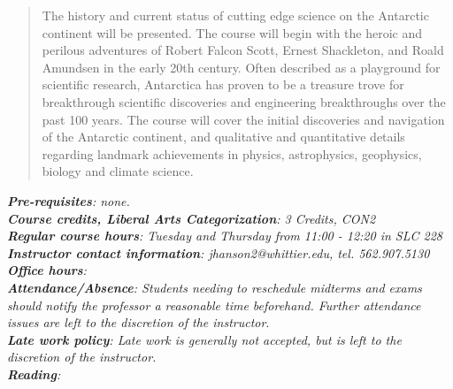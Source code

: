\documentclass[10pt]{article}
\begin{document}
\maketitle

\begin{abstract}
The history and current status of cutting edge science on the Antarctic continent will be presented. The course will begin with the heroic and perilous adventures of Robert Falcon Scott, Ernest Shackleton, and Roald Amundsen in the early 20th century. Often described as a playground for scientific research, Antarctica has proven to be a treasure trove for breakthrough scientific discoveries and engineering breakthroughs over the past 100 years. The course will cover the initial discoveries and navigation of the Antarctic continent, and qualitative and quantitative details regarding landmark achievements in physics, astrophysics, geophysics, biology and climate science.
\end{abstract}
\noindent
\textit{\textbf{Pre-requisites}: none.} \\
\textit{\textbf{Course credits, Liberal Arts Categorization}: 3 Credits, CON2} \\
\textit{\textbf{Regular course hours}: Tuesday and Thursday from 11:00 - 12:20 in SLC 228} \\
\textit{\textbf{Instructor contact information}: jhanson2@whittier.edu, tel. 562.907.5130} \\
\textit{\textbf{Office hours}: } \\
\textit{\textbf{Attendance/Absence}: Students needing to reschedule midterms and exams should notify the professor a reasonable time beforehand. Further attendance issues are left to the discretion of the instructor}.\\ 
\textit{\textbf{Late work policy}: Late work is generally not accepted, but is left to the discretion of the instructor.} \\
\textit{\textbf{Reading}:}
\end{document}
